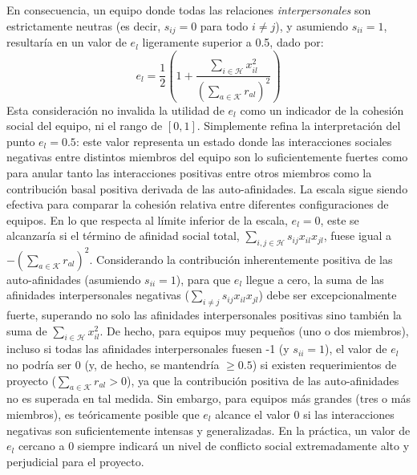 \documentclass[conference]{IEEEtran}
\begin{document}
En consecuencia, un equipo donde todas las relaciones \textit{interpersonales} son estrictamente neutras (es decir, $s_{ij}=0$ para todo $i \neq j$), y asumiendo $s_{ii}=1$, resultaría en un valor de $e_l$ ligeramente superior a 0.5, dado por:
\[ e_l = \frac{1}{2} \left( 1 + \frac{\sum_{i \in \mathcal{H}} x_{il}^2}{\left(\sum_{a \in \mathcal{K}} r_{al}\right)^2} \right) \]
Esta consideración no invalida la utilidad de $e_l$ como un indicador de la cohesión social del equipo, ni el rango de $[0,1]$. Simplemente refina la interpretación del punto $e_l=0.5$: este valor representa un estado donde las interacciones sociales negativas entre distintos miembros del equipo son lo suficientemente fuertes como para anular tanto las interacciones positivas entre otros miembros como la contribución basal positiva derivada de las auto-afinidades. La escala sigue siendo efectiva para comparar la cohesión relativa entre diferentes configuraciones de equipos. En lo que respecta al límite inferior de la escala, $e_l=0$, este se alcanzaría si el término de afinidad social total, $\sum_{i,j \in \mathcal{H}} s_{ij} x_{il} x_{jl}$, fuese igual a $-\left(\sum_{a \in \mathcal{K}} r_{al}\right)^2$. Considerando la contribución inherentemente positiva de las auto-afinidades (asumiendo $s_{ii}=1$), para que $e_l$ llegue a cero, la suma de las afinidades interpersonales negativas ($\sum_{i \neq j} s_{ij} x_{il} x_{jl}$) debe ser excepcionalmente fuerte, superando no solo las afinidades interpersonales positivas sino también la suma de $\sum_{i \in \mathcal{H}} x_{il}^2$. De hecho, para equipos muy pequeños (uno o dos miembros), incluso si todas las afinidades interpersonales fuesen -1 (y $s_{ii}=1$), el valor de $e_l$ no podría ser 0 (y, de hecho, se mantendría $\geq 0.5$) si existen requerimientos de proyecto ($\sum_{a \in \mathcal{K}} r_{al} > 0$), ya que la contribución positiva de las auto-afinidades no es superada en tal medida. Sin embargo, para equipos más grandes (tres o más miembros), es teóricamente posible que $e_l$ alcance el valor 0 si las interacciones negativas son suficientemente intensas y generalizadas. En la práctica, un valor de $e_l$ cercano a 0 siempre indicará un nivel de conflicto social extremadamente alto y perjudicial para el proyecto.
\end{document}
